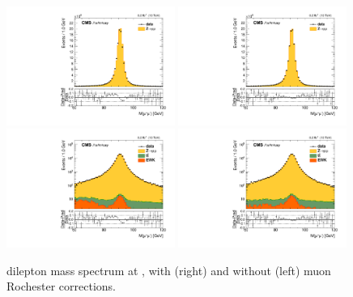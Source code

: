 \begin{figure}[htbp]
\centering
\includegraphics[width=0.49\textwidth]{plots/LepScaleSmear/plotZmm13TeV_noCorr/zmm.pdf}
\includegraphics[width=0.49\textwidth]{plots/LepScaleSmear/plotZmm13TeV_corr/zmm.pdf}
\\
\includegraphics[width=0.49\textwidth]{plots/LepScaleSmear/plotZmm13TeV_noCorr/zmmlog.pdf}
\includegraphics[width=0.49\textwidth]{plots/LepScaleSmear/plotZmm13TeV_corr/zmmlog.pdf}
\caption{\zmm dilepton mass spectrum at \sh, with (right) and without (left) muon Rochester corrections.}
\label{fig:lepscale:zmm:13}
\end{figure}